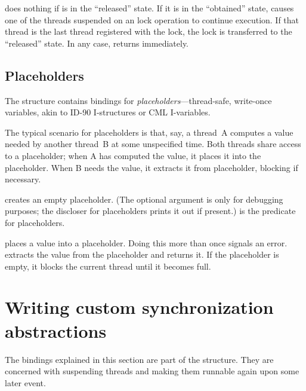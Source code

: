 does nothing if  is in the ``released''
state.  If it is in the ``obtained'' state, 
causes one of the threads suspended on an  lock
operation to continue execution.  If that thread is the last thread
registered with the lock, the lock is transferred to the ``released''
state.  In any case,  returns immediately.

\subsection{Placeholders}
\label{placeholders}

The  structure contains bindings for
\textit{placeholders}---thread-safe, write-once variables, akin to
ID-90 I-structures or CML I-variables.

The typical scenario for placeholders is that, say, a thread~A
computes a value needed by another thread~B at some unspecified time.
Both threads share access to a placeholder; when A has computed the
value, it places it into the placeholder.  When B needs the value, it
extracts it from placeholder, blocking if necessary.
%
\begin{protos}
\end{protos}
%
 creates an empty placeholder.  (The optional
 argument is only for debugging purposes; the discloser for
placeholders prints it out if present.)   is the
predicate for placeholders.

 places a value into a placeholder.  Doing this
more than once signals an error.   extracts
the value from the placeholder and returns it.  If the placeholder is
empty, it blocks the current thread until it becomes full.



\section{Writing custom synchronization abstractions}

The bindings explained in this section are part of the
 structure.  They are concerned with suspending
threads and making them runnable again upon some later event.

